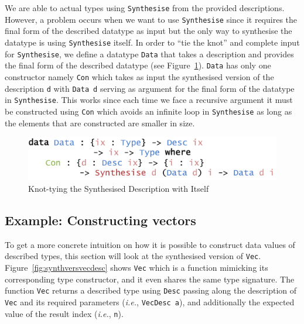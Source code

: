 \documentclass{ituthesis}
\newcommand{\ttconstructor}[1]{\textcolor{constructor-color}{\texttt{#1}}}
\newcommand{\tttype}[1]{\textcolor{type-color}{\texttt{#1}}}
\newcommand{\ttdec}[1]{\textcolor{declared-var-color}{\texttt{#1}}}
\newcommand{\ttvar}[1]{\textcolor{local-var-color}{\texttt{#1}}}
\theoremstyle{break}
\begin{document}
We are able to actual types using \ttdec{Synthesise} from the provided descriptions.
However, a problem occurs when we want to use \ttdec{Synthesise} since it requires the final form of the described datatype as input but the only way to synthesise the datatype is using \ttdec{Synthesise} itself.
In order to ``tie the knot'' and complete input for \ttdec{Synthesise}, we define a datatype \tttype{Data} that takes a description and provides the final form of the described datatype (see Figure~\ref{fig:datafromdesc}).
\tttype{Data} has only one constructor namely \ttconstructor{Con} which takes as input the synthesised version of the description \ttvar{d} with \tttype{Data}~\ttvar{d} serving as argument for the final form of the datatype in \ttdec{Synthesise}. This works since each time we face a recursive argument it must be constructed using \ttconstructor{Con} which avoids an infinite loop in \ttdec{Synthesise} as long as the elements that are constructed are smaller in size.

\begin{figure}[ht]
\begin{center}
    \includegraphics[scale=0.5]{Figures/TyingTheSynthesisKnot.png}
\end{center}
\caption{Knot-tying the Synthesised Description with Itself}
\label{fig:datafromdesc}
\end{figure}

\subsection{Example: Constructing vectors}
\label{sub:Example:Constructing Vectors}

To get a more concrete intuition on how it is possible to construct data values of described types, this section will look at the synthesised version of \tttype{Vec}.
Figure~\ref{fig:synthversvecdesc} shows \ttdec{Vec} which is a function mimicking its corresponding type constructor, and it even shares the same type signature.
The function \ttdec{Vec} returns a described type using \tttype{Desc} passing along the description of \tttype{Vec} and its required parameters (\textit{i.e.}, \ttdec{VecDesc}~\ttvar{a}), 
and additionally the expected value of the result index (\textit{i.e.}, \ttvar{n}).
\end{document}
